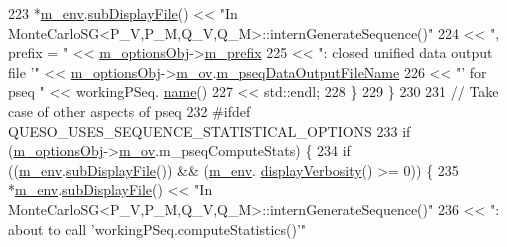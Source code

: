 \begin{DoxyCode}
223       *\hyperlink{class_q_u_e_s_o_1_1_monte_carlo_s_g_a30055a359b22cde54681679aed8ae6e7}{m\_env}.\hyperlink{class_q_u_e_s_o_1_1_base_environment_a8a0064746ae8dddfece4229b9ad374d6}{subDisplayFile}() << \textcolor{stringliteral}{"In
       MonteCarloSG<P\_V,P\_M,Q\_V,Q\_M>::internGenerateSequence()"}
224                               << \textcolor{stringliteral}{", prefix = "}                         << 
      \hyperlink{class_q_u_e_s_o_1_1_monte_carlo_s_g_acf7ce935648fd3a5d0ee23685708b4ca}{m\_optionsObj}->\hyperlink{class_q_u_e_s_o_1_1_monte_carlo_s_g_options_ac640fa60af7134d4113e9b7481a34f6c}{m\_prefix}
225                               << \textcolor{stringliteral}{": closed unified data output file '"} << 
      \hyperlink{class_q_u_e_s_o_1_1_monte_carlo_s_g_acf7ce935648fd3a5d0ee23685708b4ca}{m\_optionsObj}->\hyperlink{class_q_u_e_s_o_1_1_monte_carlo_s_g_options_a4bc6849a41ede87425cad9ab6e97df11}{m\_ov}.\hyperlink{class_q_u_e_s_o_1_1_mc_options_values_a8db3604c003959cb7ae7144a6bb37834}{m\_pseqDataOutputFileName}
226                               << \textcolor{stringliteral}{"' for pseq "}                         << workingPSeq.
      \hyperlink{class_q_u_e_s_o_1_1_base_vector_sequence_a48f6fe02cf77f4233d3bcdfef3870f19}{name}()
227                               << std::endl;
228     \}
229   \}
230 
231   \textcolor{comment}{// Take case of other aspects of pseq}
232 \textcolor{preprocessor}{#ifdef QUESO\_USES\_SEQUENCE\_STATISTICAL\_OPTIONS}
233 \textcolor{preprocessor}{}  \textcolor{keywordflow}{if} (\hyperlink{class_q_u_e_s_o_1_1_monte_carlo_s_g_acf7ce935648fd3a5d0ee23685708b4ca}{m\_optionsObj}->\hyperlink{class_q_u_e_s_o_1_1_monte_carlo_s_g_options_a4bc6849a41ede87425cad9ab6e97df11}{m\_ov}.m\_pseqComputeStats) \{
234     \textcolor{keywordflow}{if} ((\hyperlink{class_q_u_e_s_o_1_1_monte_carlo_s_g_a30055a359b22cde54681679aed8ae6e7}{m\_env}.\hyperlink{class_q_u_e_s_o_1_1_base_environment_a8a0064746ae8dddfece4229b9ad374d6}{subDisplayFile}()) && (\hyperlink{class_q_u_e_s_o_1_1_monte_carlo_s_g_a30055a359b22cde54681679aed8ae6e7}{m\_env}.
      \hyperlink{class_q_u_e_s_o_1_1_base_environment_a1fe5f244fc0316a0ab3e37463f108b96}{displayVerbosity}() >= 0)) \{
235       *\hyperlink{class_q_u_e_s_o_1_1_monte_carlo_s_g_a30055a359b22cde54681679aed8ae6e7}{m\_env}.\hyperlink{class_q_u_e_s_o_1_1_base_environment_a8a0064746ae8dddfece4229b9ad374d6}{subDisplayFile}() << \textcolor{stringliteral}{"In
       MonteCarloSG<P\_V,P\_M,Q\_V,Q\_M>::internGenerateSequence()"}
236                               << \textcolor{stringliteral}{": about to call 'workingPSeq.computeStatistics()'"}

\end{DoxyCode}
